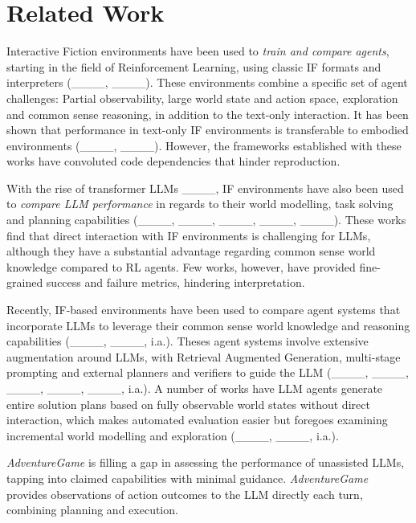 \section{Related Work}
Interactive Fiction environments have been used to \textit{train and compare agents}, starting in the field of Reinforcement Learning, using classic IF formats and interpreters (____, ____). These environments combine a specific set of agent challenges: Partial observability, large world state and action space, exploration and common sense reasoning, in addition to the text-only interaction. It has been shown that performance in text-only IF environments is transferable to embodied environments (____, ____). However, the frameworks established with these works have convoluted code dependencies that hinder reproduction.

With the rise of transformer LLMs ____, IF environments have also been used to \textit{compare LLM performance} in regards to their world modelling, task solving and planning capabilities (____, ____, ____, ____, ____). These works find that direct interaction with IF environments is challenging for LLMs, although they have a substantial advantage regarding common sense world knowledge compared to RL agents. Few works, however, %
have provided fine-grained success and failure metrics, hindering interpretation.

Recently, IF-based environments have been used to compare agent systems that incorporate LLMs to leverage their common sense world knowledge and reasoning capabilities (____, ____, i.a.). Theses agent systems involve extensive augmentation around LLMs, with Retrieval Augmented Generation, multi-stage prompting and external planners and verifiers to guide the LLM (____, ____, ____, ____, ____, i.a.). A number of works have LLM agents generate entire solution plans based on fully observable world states without direct interaction, which makes automated evaluation easier but foregoes examining incremental world modelling and exploration (____, ____, i.a.).

\textit{AdventureGame} is filling a gap in assessing the performance of unassisted LLMs, tapping into claimed capabilities with minimal guidance. \textit{AdventureGame} provides observations of action outcomes to the LLM directly each turn, combining planning and execution.